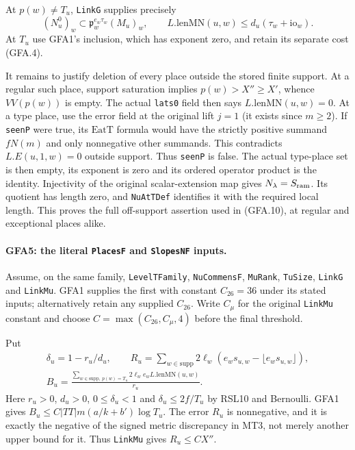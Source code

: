 At $p(w)\ne T_u$, \texttt{LinkG} supplies precisely
\[
 (N_u^0)_w\subset\mathfrak p_w^{e_w\tau_w}(M_u)_w,
 \qquad L.\mathrm{lenMN}(u,w)\le d_u(\tau_w+\mathrm{io}_w).
                                                               \tag{GFA.13}
\]
At $T_u$ use GFA1's inclusion, which has exponent zero, and
retain its separate cost (GFA.4).

It remains to justify deletion of every place outside the stored
finite support.  At a regular such place, support saturation
implies $p(w)>X''\ge X'$, whence $VV(p(w))$ is empty.
The actual \texttt{lats0} field then says
$L.\mathrm{lenMN}(u,w)=0$.  At a type place, use the error field
at the original lift $j=1$ (it exists since $m\ge2$).  If
\texttt{seenP} were true, its $\mathrm{EatT}$ formula would have
the strictly positive summand $fN(m)$ and only nonnegative other
summands.  This contradicts $L.E(u,1,w)=0$ outside support.
Thus \texttt{seenP} is false.  The actual type-place set is then
empty, its exponent is zero and its ordered operator product is
the identity.  Injectivity of the original scalar-extension map
gives $N_\lambda=S_{\rm ram}$.  Its quotient has length zero,
and \texttt{NuAtTDef} identifies it with the required local
length.  This proves the full off-support assertion used in
(GFA.10), at regular and exceptional places alike.

\paragraph{GFA5: the literal \texttt{PlacesF} and \texttt{SlopesNF} inputs.}
\label{claim:GFA5}
Assume, on the same family, \texttt{LevelTFamily},
\texttt{NuCommensF}, \texttt{MuRank}, \texttt{TuSize},
\texttt{LinkG} and \texttt{LinkMu}.  GFA1 supplies the first
with constant $C_{26}=36$ under its stated inputs; alternatively
retain any supplied $C_{26}$.  Write $C_\mu$ for the original
\texttt{LinkMu} constant and choose
$C=\max(C_{26},C_\mu,4)$ before the final threshold.

Put
\[
\begin{gathered}
\delta_u=1-r_u/d_u,\qquad
R_u=\sum_{w\in\mathrm{supp}}2\ell_w
                    (e_ws_{u,w}-\lfloor e_ws_{u,w}\rfloor),\\
B_u=\frac{\sum_{w\in\mathrm{supp},\ p(w)=T_u}
                 2\ell_we_wL.\mathrm{lenMN}(u,w)}{r_u}.
\end{gathered}
                                                               \tag{GFA.14}
\]
Here $r_u>0$, $d_u>0$, $0\le\delta_u<1$ and
$\delta_u\le2f/T_u$ by RSL10 and Bernoulli.  GFA1 gives
$B_u\le C|TT|m(a/k+b')\log T_u$.
The error $R_u$ is nonnegative, and it is exactly the negative of
the signed metric discrepancy in MT3, not merely another upper
bound for it.  Thus \texttt{LinkMu} gives $R_u\le CX''$.


